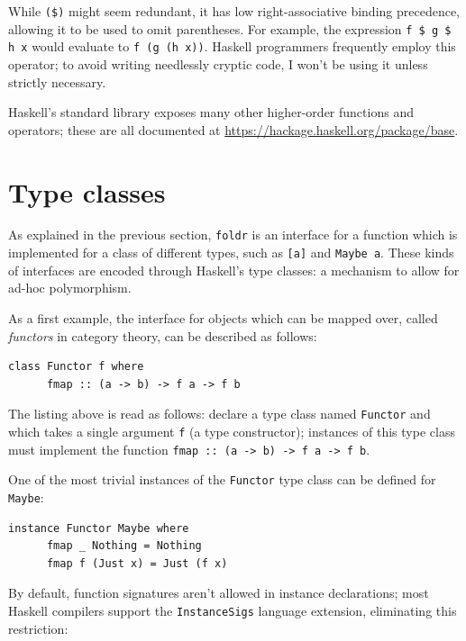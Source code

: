 \documentclass[UdineBachThesis,american,11pt]{PhdThesis}
\begin{document}
  While \mbox{\texttt{(\$)}} might seem redundant, it has low right-associative
  binding precedence, allowing it to be used to omit parentheses. For example,
  the expression \mbox{\texttt{f \$ g \$ h x}} would evaluate to
  \mbox{\texttt{f (g (h x))}}. Haskell programmers frequently employ this
  operator; to avoid writing needlessly cryptic code, I won't be using it unless
  strictly necessary.

  Haskell's standard library exposes many other higher-order functions and
  operators; these are all documented at
  \url{https://hackage.haskell.org/package/base}.

  \section{Type classes}

  As explained in the previous section, \mbox{\texttt{foldr}} is an interface
  for a function which is implemented for a class of different types, such as
  \mbox{\texttt{[a]}} and \mbox{\texttt{Maybe a}}. These kinds of interfaces are
  encoded through Haskell's type classes: a mechanism to allow for ad-hoc
  polymorphism.

  As a first example, the interface for objects which can be mapped over, called
  \emph{functors} in category theory, can be described as follows:

  \begin{Verbatim}[gobble=4,fontsize=\small]
    class Functor f where
      fmap :: (a -> b) -> f a -> f b
  \end{Verbatim}

  The listing above is read as follows: declare a type class named
  \mbox{\texttt{Functor}} and which takes a single argument \texttt{f} (a type
  constructor); instances of this type class must implement the function
  \mbox{\texttt{fmap :: (a -> b) -> f a -> f b}}.

  One of the most trivial instances of the \mbox{\texttt{Functor}} type class
  can be defined for \mbox{\texttt{Maybe}}:

  \begin{Verbatim}[gobble=4,fontsize=\small]
    instance Functor Maybe where
      fmap _ Nothing = Nothing
      fmap f (Just x) = Just (f x)
  \end{Verbatim}

  By default, function signatures aren't allowed in instance declarations; most
  Haskell compilers support the \mbox{\texttt{InstanceSigs}} language extension,
  eliminating this restriction:
\end{document}
